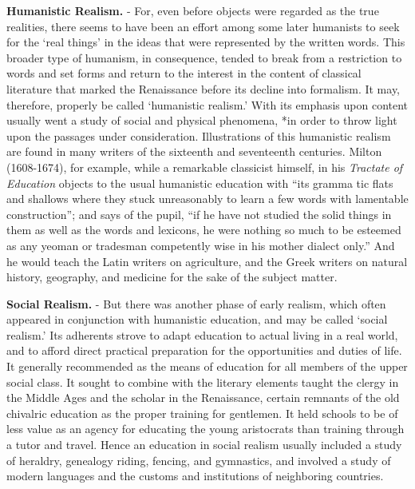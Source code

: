 \documentclass[
]{book}
\begin{document}
\textbf{Humanistic Realism.} - For, even before objects were regarded as the true realities, there seems to have been an effort among some later humanists to seek for the `real things' in the ideas that were represented by the written words. This broader type of humanism, in consequence, tended to break from a restriction to words and set forms and return to the interest in the content of classical literature that marked the Renaissance before its decline into formalism. It may, therefore, properly be called `humanistic realism.' With its emphasis upon content usually went a study of social and physical phenomena, *in order to throw light upon the passages under consideration. Illustrations of this humanistic realism are found in many writers of the sixteenth and seventeenth centuries. Milton (1608-1674), for example, while a remarkable classicist himself, in his \emph{Tractate of Education} objects to the usual humanistic education with ``its gramma tic flats and shallows where they stuck unreasonably to learn a few words with lamentable construction''; and says of the pupil, ``if he have not studied the solid things in them as well as the words and lexicons, he were nothing so much to be esteemed as any yeoman or tradesman competently wise in his mother dialect only.'' And he would teach the Latin writers on agriculture, and the Greek writers on natural history, geography, and medicine for the sake of the subject matter.

\textbf{Social Realism.} - But there was another phase of early realism, which often appeared in conjunction with humanistic education, and may be called `social realism.' Its adherents strove to adapt education to actual living in a real world, and to afford direct practical preparation for the opportunities and duties of life. It generally recommended as the means of education for all members of the upper social class. It sought to combine with the literary elements taught the clergy in the Middle Ages and the scholar in the Renaissance, certain remnants of the old chivalric education as the proper training for gentlemen. It held schools to be of less value as an agency for educating the young aristocrats than training through a tutor and travel. Hence an education in social realism usually included a study of heraldry, genealogy riding, fencing, and gymnastics, and involved a study of modern languages and the customs and institutions of neighboring countries.
\end{document}

